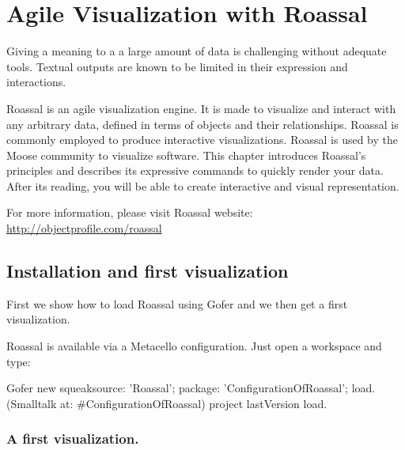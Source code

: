 \documentclass[a4paper,10pt,twoside]{book}
\begin{document}
\fi
\sloppy
\chapter{Agile Visualization with Roassal}


Giving a meaning to a a large amount of data is challenging without adequate tools. Textual outputs are known to be limited in their expression and interactions. 

Roassal is an agile visualization engine. It is made to visualize and interact with any arbitrary data, defined in terms of objects and their relationships. Roassal is commonly employed to produce interactive visualizations. Roassal is used by the Moose community to visualize software. This chapter introduces Roassal's principles and describes its expressive commands to quickly render your data. After its reading, you will be able to create interactive and visual representation.

For more information, please visit Roassal website: \url{http://objectprofile.com/roassal}

\section{Installation and first visualization}
First we show how to load Roassal using Gofer and we then get a first visualization.

Roassal is available via a Metacello configuration. Just open a workspace and type:

\begin{code}{}
Gofer new
	squeaksource: 'Roassal'; 
	package: 'ConfigurationOfRoassal';
	load.
(Smalltalk at: #ConfigurationOfRoassal) project lastVersion load.
\end{code}


\subsection{A first visualization.}


\end{document}
